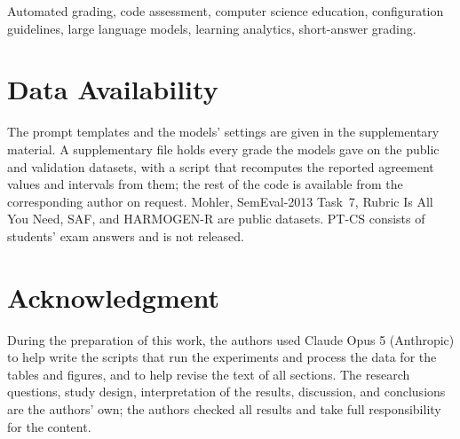 \documentclass{ieeeaccess}
\begin{document}
\begin{keywords}
Automated grading, code assessment, computer science education, configuration guidelines,
large language models, learning analytics, short-answer grading.
\end{keywords}

\titlepgskip=-21pt

\maketitle








\section*{Data Availability}
The prompt templates and the models' settings are given in the supplementary material. A supplementary file
holds every grade the models gave on the public and validation datasets, with a script that recomputes the
reported agreement values and intervals from them; the rest of the code is available from the corresponding
author on request. Mohler, SemEval-2013 Task~7, Rubric Is All You Need,
SAF, and HARMOGEN-R are public datasets. PT-CS consists of students' exam answers and is not released.

\section*{Acknowledgment}
During the preparation of this work, the authors used Claude Opus 5 (Anthropic) to help write the scripts that
run the experiments and process the data for the tables and figures, and to help revise the text of all sections. The research
questions, study design, interpretation of the results, discussion, and conclusions are the authors' own; the
authors checked all results and take full responsibility for the content.
\end{document}
